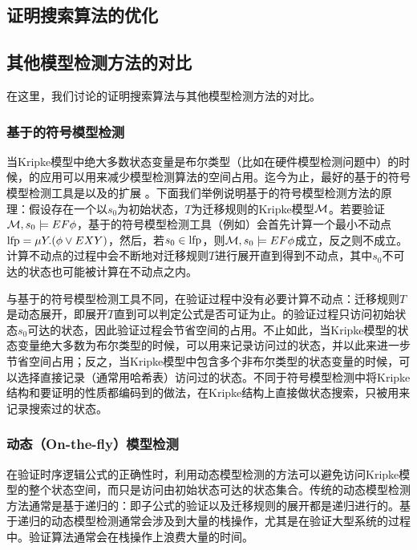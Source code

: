 \subsection{证明搜索算法的优化}\label{subsec:proofsearch:optimize}

\subsection{其他\CTLP{}模型检测方法的对比}
在这里，我们讨论\sctlprov{}的证明搜索算法与其他\CTLP{}模型检测方法的对比。

\subsubsection{基于\BDD{}的符号模型检测}
当Kripke模型中绝大多数状态变量是布尔类型（比如在硬件模型检测问题中）的时候，\BDD{}的应用可以用来减少模型检测算法的空间占用。迄今为止，最好的基于\BDD{}的符号模型检测工具是\nusmv{}\cite{mcmillan93,CimattiCGR99}以及\nusmv{}的扩展\nuxmv{} \cite{CAVCDGMMMRT14}。下面我们举例说明基于\BDD{}的符号模型检测方法的原理：假设存在一个以$s_0$为初始状态，$T$为迁移规则的Kripke模型$\cal M$。若要验证${\cal M},s_0\models EF\phi$，基于\BDD{}的符号模型检测工具（例如\nusmv{}）会首先计算一个最小不动点$\textup{lfp}=\mu Y. (\phi\vee EXY)$，然后，若$s_0\in \textup{lfp}$，则${\cal M},s_0\models EF\phi$成立，反之则不成立。计算不动点的过程中会不断地对迁移规则$T$进行展开直到得到不动点，其中$s_0$不可达的状态也可能被计算在不动点之内。

与基于\BDD{}的符号模型检测工具不同，\sctlprov{}在验证过程中没有必要计算不动点：迁移规则$T$是动态展开，即展开$T$直到可以判定公式是否可证为止。\sctlprov{}的验证过程只访问初始状态$s_0$可达的状态，因此验证过程会节省空间的占用。不止如此，当Kripke模型的状态变量绝大多数为布尔类型的时候，\sctlprov{}可以用\BDD{}来记录访问过的状态，并以此来进一步节省空间占用；反之，当Kripke模型中包含多个非布尔类型的状态变量的时候，\sctlprov{}可以选择直接记录（通常用哈希表）访问过的状态。不同于符号模型检测中将Kripke结构和要证明的性质都编码到\BDD{}的做法，\sctlprov{}在Kripke结构上直接做状态搜索，\BDD{}只被用来记录搜索过的状态。

\subsubsection{动态（On-the-fly）模型检测}
在验证时序逻辑公式的正确性时，利用动态模型检测的方法可以避免访问Kripke模型的整个状态空间，而只是访问由初始状态可达的状态集合。传统的\CTL{}动态模型检测方法\cite{VergauwenL93,BCG95}通常是基于递归的：即子公式的验证以及迁移规则的展开都是递归进行的。基于递归的\CTL{}动态模型检测通常会涉及到大量的栈操作，尤其是在验证大型系统的过程中。验证算法通常会在栈操作上浪费大量的时间。

